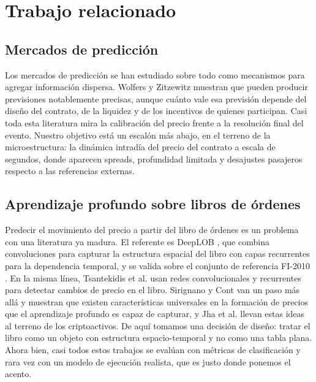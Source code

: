 \documentclass[11pt,a4paper]{article}
\begin{document}
\section{Trabajo relacionado}

\subsection{Mercados de predicción}

Los mercados de predicción se han estudiado sobre todo como mecanismos para
agregar información dispersa. Wolfers y Zitzewitz \cite{wolfers2004prediction}
muestran que pueden producir previsiones notablemente precisas, aunque cuánto vale
esa previsión depende del diseño del contrato, de la liquidez y de los incentivos
de quienes participan. Casi toda esta literatura mira la calibración del precio
frente a la resolución final del evento. Nuestro objetivo está un escalón más abajo,
en el terreno de la microestructura: la dinámica intradía del precio del contrato a
escala de segundos, donde aparecen spreads, profundidad limitada y desajustes
pasajeros respecto a las referencias externas.

\subsection{Aprendizaje profundo sobre libros de órdenes}

Predecir el movimiento del precio a partir del libro de órdenes es un problema con
una literatura ya madura. El referente es DeepLOB \cite{zhang2019deeplob}, que
combina convoluciones para capturar la estructura espacial del libro con capas
recurrentes para la dependencia temporal, y se valida sobre el conjunto de
referencia FI-2010 \cite{ntakaris2018}. En la misma línea, Tsantekidis et al.
\cite{tsantekidis2017} usan redes convolucionales y recurrentes para detectar
cambios de precio en el libro. Sirignano y Cont \cite{sirignano2019universal} van
un paso más allá y muestran que existen características universales en la formación
de precios que el aprendizaje profundo es capaz de capturar, y Jha et al.
\cite{jha2020digital} llevan estas ideas al terreno de los criptoactivos. De aquí
tomamos una decisión de diseño: tratar el libro como un objeto con estructura
espacio-temporal y no como una tabla plana. Ahora bien, casi todos estos trabajos
se evalúan con métricas de clasificación y rara vez con un modelo de ejecución
realista, que es justo donde ponemos el acento.
\end{document}
